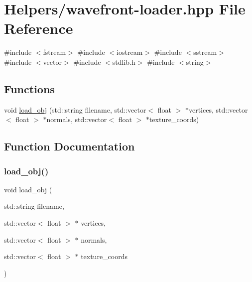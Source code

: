 \hypertarget{wavefront-loader_8hpp}{}\section{Helpers/wavefront-\/loader.hpp File Reference}
\label{wavefront-loader_8hpp}
{\ttfamily \#include $<$fstream$>$}\newline
{\ttfamily \#include $<$iostream$>$}\newline
{\ttfamily \#include $<$sstream$>$}\newline
{\ttfamily \#include $<$vector$>$}\newline
{\ttfamily \#include $<$stdlib.\+h$>$}\newline
{\ttfamily \#include $<$string$>$}\newline
\subsection*{Functions}
\begin{DoxyCompactItemize}
\item 
void \mbox{\hyperlink{wavefront-loader_8hpp_a545203558434ccbdf58e4fa3505153a6}{load\+\_\+obj}} (std\+::string filename, std\+::vector$<$ float $>$ $\ast$vertices, std\+::vector$<$ float $>$ $\ast$normals, std\+::vector$<$ float $>$ $\ast$texture\+\_\+coords)
\end{DoxyCompactItemize}


\subsection{Function Documentation}
\mbox{\label{wavefront-loader_8hpp_a545203558434ccbdf58e4fa3505153a6}} 
\subsubsection{\texorpdfstring{load\+\_\+obj()}{load\_obj()}}
{\footnotesize\ttfamily void load\+\_\+obj (\begin{DoxyParamCaption}\item[{std\+::string}]{filename,  }\item[{std\+::vector$<$ float $>$ $\ast$}]{vertices,  }\item[{std\+::vector$<$ float $>$ $\ast$}]{normals,  }\item[{std\+::vector$<$ float $>$ $\ast$}]{texture\+\_\+coords }\end{DoxyParamCaption})}

